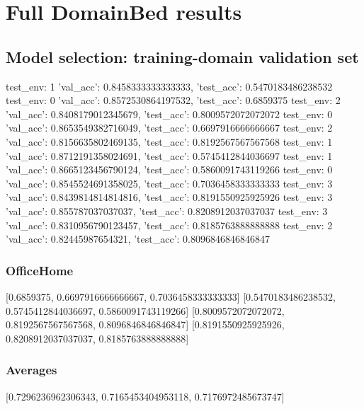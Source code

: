 \documentclass{article}
\begin{document}
\section{Full DomainBed results}

\subsection{Model selection: training-domain validation set}
test_env: 1
{'val_acc': 0.8458333333333333, 'test_acc': 0.5470183486238532}
test_env: 0
{'val_acc': 0.8572530864197532, 'test_acc': 0.6859375}
test_env: 2
{'val_acc': 0.8408179012345679, 'test_acc': 0.8009572072072072}
test_env: 0
{'val_acc': 0.8653549382716049, 'test_acc': 0.6697916666666667}
test_env: 2
{'val_acc': 0.8156635802469135, 'test_acc': 0.8192567567567568}
test_env: 1
{'val_acc': 0.8712191358024691, 'test_acc': 0.5745412844036697}
test_env: 1
{'val_acc': 0.8665123456790124, 'test_acc': 0.5860091743119266}
test_env: 0
{'val_acc': 0.8545524691358025, 'test_acc': 0.7036458333333333}
test_env: 3
{'val_acc': 0.8439814814814816, 'test_acc': 0.8191550925925926}
test_env: 3
{'val_acc': 0.855787037037037, 'test_acc': 0.8208912037037037}
test_env: 3
{'val_acc': 0.8310956790123457, 'test_acc': 0.8185763888888888}
test_env: 2
{'val_acc': 0.82445987654321, 'test_acc': 0.8096846846846847}

\subsubsection{OfficeHome}
[0.6859375, 0.6697916666666667, 0.7036458333333333]
[0.5470183486238532, 0.5745412844036697, 0.5860091743119266]
[0.8009572072072072, 0.8192567567567568, 0.8096846846846847]
[0.8191550925925926, 0.8208912037037037, 0.8185763888888888]

\begin{center}
\end{center}

\subsubsection{Averages}
[0.7296236962306343, 0.7165453404953118, 0.7176972485673747]

\begin{center}
\end{center}
\end{document}
